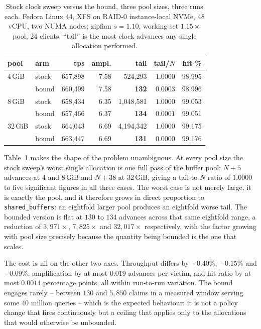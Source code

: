 \documentclass[sigconf,nonacm]{acmart}
\begin{document}
\begin{table}[t]
\centering
\caption{Stock clock sweep versus the bound, three pool sizes, three runs each.
Fedora Linux 44, XFS on RAID-0 instance-local NVMe, 48 vCPU, two NUMA nodes;
zipfian $s=1.10$, working set $1.15\times$ pool, 24 clients. ``tail'' is the
most clock advances any single allocation performed.}
\label{tab:tailnvme}
\small
\begin{tabular}{llrrrrr}
\toprule
pool & arm & tps & ampl. & tail & tail/$N$ & hit \% \\
\midrule
4\,GiB  & stock & 657{,}898 & 7.58 & 524{,}293   & $1.0000$ & 98.995 \\
        & bound & 660{,}499 & 7.58 & \textbf{132} & $0.0003$ & 98.996 \\
8\,GiB  & stock & 658{,}434 & 6.35 & 1{,}048{,}581 & $1.0000$ & 99.053 \\
        & bound & 657{,}466 & 6.37 & \textbf{134} & $0.0001$ & 99.051 \\
32\,GiB & stock & 664{,}043 & 6.69 & 4{,}194{,}342 & $1.0000$ & 99.175 \\
        & bound & 663{,}447 & 6.69 & \textbf{131} & $0.0000$ & 99.176 \\
\bottomrule
\end{tabular}
\end{table}

Table~\ref{tab:tailnvme} makes the shape of the problem unambiguous. At every
pool size the stock sweep's worst single allocation is one full pass of the
buffer pool: $N+5$ advances at 4 and 8\,GiB and $N+38$ at 32\,GiB, giving a
tail-to-$N$ ratio of $1.0000$ to five significant figures in all three cases.
The worst case is not merely large, it is exactly the pool, and it therefore
grows in direct proportion to \texttt{shared\_buffers}: an eightfold larger
pool produces an eightfold worse tail. The bounded version is flat at $130$ to
$134$ advances across that same eightfold range, a reduction of $3{,}971\times$,
$7{,}825\times$ and $32{,}017\times$ respectively, with the factor growing with
pool size precisely because the quantity being bounded is the one that scales.

The cost is nil on the other two axes. Throughput differs by $+0.40\%$,
$-0.15\%$ and $-0.09\%$, amplification by at most $0.019$ advances per victim,
and hit ratio by at most $0.0014$ percentage points, all within run-to-run
variation. The bound engages rarely -- between $130$ and $5{,}850$ claims in a
measured window serving some $40$ million queries -- which is the expected
behaviour: it is not a policy change that fires continuously but a ceiling that
applies only to the allocations that would otherwise be unbounded.
\end{document}
